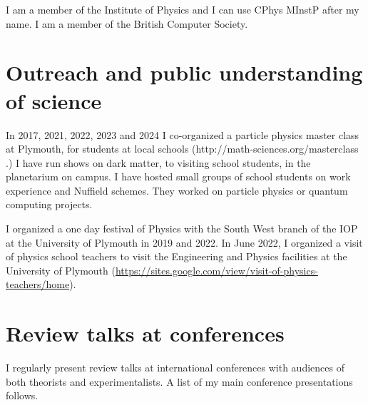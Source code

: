 \documentclass[12pt]{article}
\begin{document}
I am a member of the Institute of Physics and I can use
CPhys MInstP after my name. I am a member of the British Computer
Society.

\section{Outreach and public understanding of science}

In 2017, 2021, 2022, 2023 and 2024 I co-organized a particle physics master 
class at Plymouth, for students at local schools  (http://math-sciences.org/masterclass .)
I have run shows on dark matter, to visiting school students,
in the planetarium on campus. I have hosted small groups
of school students on work experience and Nuffield 
schemes. They worked on particle physics or quantum computing
projects.

I organized a one day festival of Physics with the South West branch of
the IOP at the University of Plymouth in 2019 and 2022. In June 2022,
I organized a visit of physics school teachers to visit
the Engineering and Physics facilities at the University of
Plymouth (\url{https://sites.google.com/view/visit-of-physics-teachers/home}).



\section{Review talks at conferences}

I regularly present review talks at international
conferences with audiences of both theorists and experimentalists.
A list of my main conference presentations follows.
\end{document}
